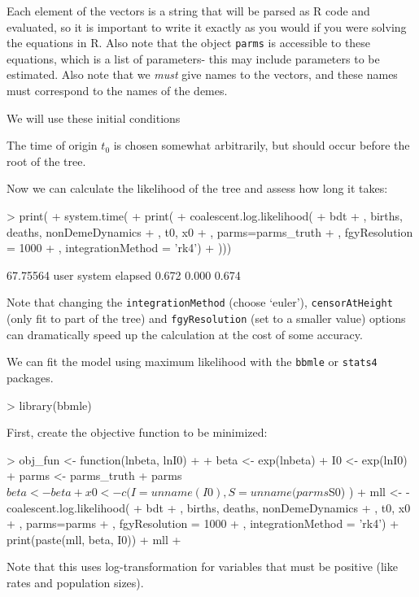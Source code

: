 \documentclass{article}
\begin{document}
Each element of the vectors is a string that will be parsed as R code and evaluated, so it is important to write it exactly as you would if you were solving the equations in R.
Also note that the object \texttt{parms} is accessible to these equations, which is a list of parameters- this may include parameters to be estimated.
Also note that we \emph{must} give names to the vectors, and these names must correspond to the names of the demes. 

We will use these initial conditions
\begin{Schunk}
\end{Schunk}
The time of origin $t_0$ is chosen somewhat arbitrarily, but should occur before the root of the tree. 

Now we can calculate the likelihood of the tree and assess how long it takes:
\begin{Schunk}
\begin{Sinput}
> print( 
+ system.time( 
+ print(
+   coalescent.log.likelihood(
+     bdt
+     , births, deaths, nonDemeDynamics
+     , t0, x0
+     , parms=parms_truth
+     , fgyResolution = 1000
+     , integrationMethod = 'rk4')
+ )))
\end{Sinput}
\begin{Soutput}
[1] 67.75564
   user  system elapsed 
  0.672   0.000   0.674 
\end{Soutput}
\end{Schunk}
Note that changing the \texttt{integrationMethod} (choose `euler'), \texttt{censorAtHeight} (only fit to part of the tree) and \texttt{fgyResolution} (set to a smaller value) options can dramatically speed up the calculation at the cost of some accuracy. 

We can fit the model using maximum likelihood with the \texttt{bbmle} or \texttt{stats4} packages. 
\begin{Schunk}
\begin{Sinput}
> 	library(bbmle)
\end{Sinput}
\end{Schunk}
First, create the objective function to be minimized:
\begin{Schunk}
\begin{Sinput}
> obj_fun <- function(lnbeta, lnI0)
+ {
+ 	beta <- exp(lnbeta)
+ 	I0 <- exp(lnI0)
+ 	parms <- parms_truth
+ 	parms$beta <- beta
+ 	x0 <- c(I=unname(I0), S = unname(parms$S0) )
+ 	mll <- -coalescent.log.likelihood(
+ 		bdt
+ 		, births, deaths, nonDemeDynamics
+ 		,  t0, x0
+ 		, parms=parms
+ 		, fgyResolution = 1000
+ 		, integrationMethod = 'rk4')
+ 	print(paste(mll, beta, I0))
+ 	mll
+ }
\end{Sinput}
\end{Schunk}
Note that this uses log-transformation for variables that must be positive (like rates and population sizes).
\end{document}
